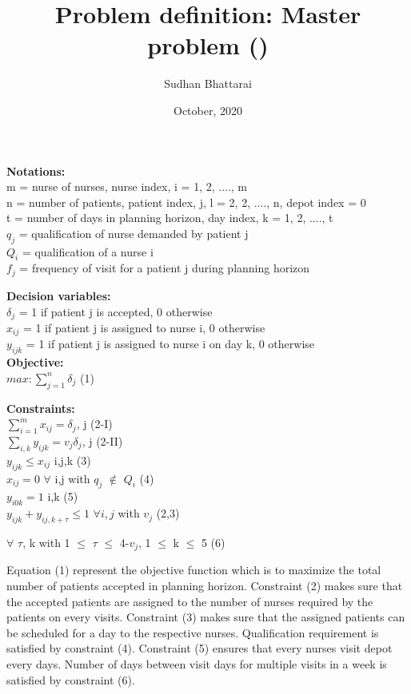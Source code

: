 \documentclass[12pt, letterpaper]{article}
\title{\textbf{Problem definition: Master problem (\cite{heching2019logic})}}
\author {Sudhan Bhattarai}
\date{October, 2020}
\begin{document}
\maketitle
\textbf{Notations:}\\
m = nurse of nurses, nurse index, i = 1, 2, ...., m\\
n = number of patients, patient index, j, l = 2, 2, ...., n, depot index = 0\\
t = number of days in planning horizon, day index, k = 1, 2, ...., t\\
$q_j$ = qualification of nurse demanded by patient j\\
$Q_i$ = qualification of a nurse i\\
$f_j$ = frequency of visit for a patient j during planning horizon\\
\par
\textbf{Decision variables:}\\
\(\delta_j\) = 1 if patient j is accepted, 0 otherwise \\
\(x_{ij}\) = 1 if patient j is assigned to nurse i, 0 otherwise  \\
\(y_{ijk}\) = 1 if patient j is assigned to nurse i on day k, 0 otherwise \\

\textbf{Objective:}\\
\(max: \sum_{j=1}^n \delta_j\) \hfill (1) \\
\clearpage

\textbf{Constraints:}\\
\(\sum_{i=1}^m x_{ij} = \delta_j\),\hspace{1cm} \forall j \hfill (2-I) \\
\(\sum_{i,k} y_{ijk} = v_j  \delta_j\), \hspace{1cm} \forall j   \hfill (2-II)\\
\(y_{ijk} \leq x_{ij} \) \hspace{1cm} \forall i,j,k \hfill (3)\\
\(x_{ij} = 0\) \hspace{1cm} $\forall$ i,j with $q_j$ $\notin$ $Q_i$ \hfill (4)\\
\(y_{i0k} = 1\) \hspace{1cm} \forall i,k \hfill (5)\\
\(y_{ijk} + y_{ij,k+\tau} \leq 1\) \hspace{1cm} $\forall{i,j}$ with $v_j$ \in (2,3) \par
\hspace{3.5cm} $\forall$ $\tau$, k with 1 $\leq$ $\tau$ $\leq$ 4-$v_j$, 1 $\leq$ k $\leq$ 5 \hfill (6) \\
\par
Equation (1) represent the objective function which is to maximize the total number of patients accepted in planning horizon. Constraint (2) makes sure that the accepted patients are assigned to the number of nurses required by the patients on every visits. Constraint (3) makes sure that the assigned patients can be scheduled for a day to the respective nurses. Qualification requirement is satisfied by constraint (4). Constraint (5) ensures that every nurses visit depot every days. Number of days between visit days for multiple visits in a week is satisfied by constraint (6).


\end{document}
